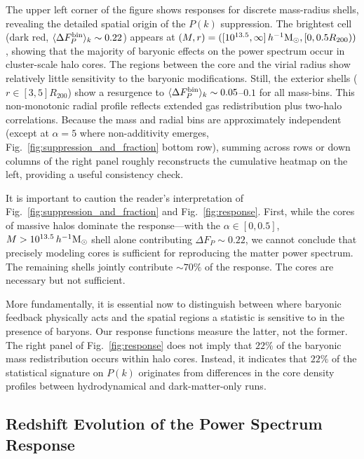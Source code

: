 \documentclass[linenumbers,trackchanges]{aastex701}
\begin{document}
The upper left corner of the figure shows responses for discrete mass-radius shells, revealing the detailed spatial origin of the $P(k)$ suppression. The brightest cell (dark red, $\langle \Delta F_P^{\rm bin} \rangle_k \sim 0.22$) appears at $(M, r) = ([10^{13.5}, \infty]\,h^{-1}{\rm M}_\odot, [0, 0.5R_{200}))$, showing that the majority of baryonic effects on the power spectrum occur in cluster-scale halo cores. The regions between the core and the virial radius show relatively little sensitivity to the baryonic modifications. Still, the exterior shells ($r \in [3, 5]R_{200}$) show a resurgence to $\langle \Delta F_P^{\rm bin} \rangle_k \sim 0.05$–$0.1$ for all mass-bins. This non-monotonic radial profile reflects extended gas redistribution plus two-halo correlations. Because the mass and radial bins are approximately independent (except at $\alpha = 5$ where non-additivity emerges, Fig.~\ref{fig:suppression_and_fraction} bottom row), summing across rows or down columns of the right panel roughly reconstructs the cumulative heatmap on the left, providing a useful consistency check.

It is important to caution the reader’s interpretation of Fig.~\ref{fig:suppression_and_fraction} and Fig.~\ref{fig:response}. First, while the cores of massive halos dominate the response—with the $\alpha\in[0,0.5]$, $M>10^{13.5}\,h^{-1}{\rm M}_\odot$ shell alone contributing $\Delta F_P \sim 0.22$, we cannot conclude that precisely modeling cores is sufficient for reproducing the matter power spectrum. The remaining shells jointly contribute $\sim 70\%$ of the response. The cores are necessary but not sufficient.

More fundamentally, it is essential now to distinguish between where baryonic feedback physically acts and the spatial regions a statistic is sensitive to in the presence of baryons. Our response functions measure the latter, not the former. The right panel of Fig.~\ref{fig:response} does not imply that $22\%$ of the baryonic mass redistribution occurs within halo cores. Instead, it indicates that $22\%$ of the statistical signature on $P(k)$ originates from differences in the core density profiles between hydrodynamical and dark-matter-only runs.

\subsection{Redshift Evolution of the Power Spectrum Response}
\end{document}
